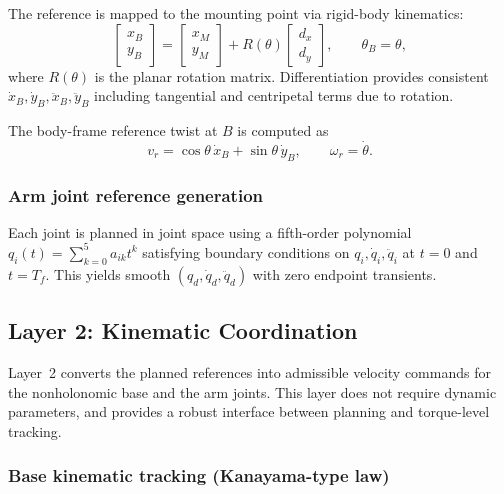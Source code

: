 \documentclass[conference]{IEEEtran}
\begin{document}
The reference is mapped to the mounting point via rigid-body kinematics:
\begin{equation}
\begin{bmatrix}x_B\\y_B\end{bmatrix}
=
\begin{bmatrix}x_M\\y_M\end{bmatrix}
+
R(\theta)\begin{bmatrix}d_x\\d_y\end{bmatrix},
\qquad \theta_B=\theta,
\end{equation}
where $R(\theta)$ is the planar rotation matrix. Differentiation provides
consistent $\dot x_B,\dot y_B,\ddot x_B,\ddot y_B$ including tangential and
centripetal terms due to rotation.

The body-frame reference twist at $B$ is computed as
\begin{equation}
v_r = \cos\theta\,\dot{x}_B + \sin\theta\,\dot{y}_B,\qquad
\omega_r = \dot{\theta}.
\label{eq:vr_omega_r}
\end{equation}

\subsubsection{Arm joint reference generation}

Each joint is planned in joint space using a fifth-order polynomial
$q_i(t)=\sum_{k=0}^{5} a_{ik} t^k$ satisfying boundary conditions on
$q_i,\dot q_i,\ddot q_i$ at $t=0$ and $t=T_f$. This yields smooth
$(q_d,\dot q_d,\ddot q_d)$ with zero endpoint transients.

\subsection{Layer 2: Kinematic Coordination}
\label{subsec:layer_kinematics}

Layer~2 converts the planned references into admissible velocity commands for
the nonholonomic base and the arm joints. This layer does not require dynamic
parameters, and provides a robust interface between planning and torque-level
tracking.

\subsubsection{Base kinematic tracking (Kanayama-type law)}
\end{document}
